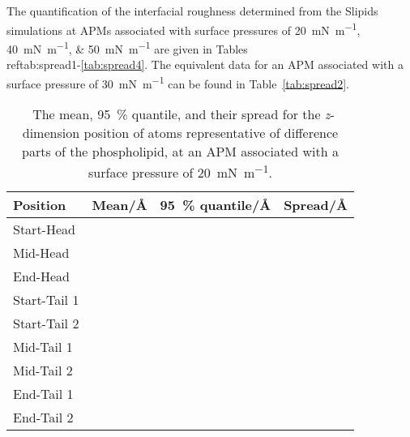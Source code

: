 The quantification of the interfacial roughness determined from the Slipids simulations at APMs associated with surface pressures of \SIlist{20;40;50}{\milli\newton\per\meter} are given in Tables~\\ref{tab:spread1}-\ref{tab:spread4}. 
The equivalent data for an APM associated with a surface pressure of \SI{30}{\milli\newton\per\meter} can be found in Table~\ref{tab:spread2}.
%
\begin{table}
\centering
\small
  \caption{\ The mean, \SI{95}{\percent} quantile, and their spread for the \emph{z}-dimension position of atoms representative of difference parts of the phospholipid, at an APM associated with a surface pressure of \SI{20}{\milli\newton\per\meter}.}
  \label{tab:spread1}
  \begin{tabular}{llll}
    \toprule
    Position & Mean/\si{\angstrom} & \SI{95}{\percent} quantile/\si{\angstrom} & Spread/\si{\angstrom} \\
    \midrule
    Start-Head &  &  &  \\
    Mid-Head &  &  &  \\
    End-Head &  &  &  \\
    \midrule
    Start-Tail 1 &  &  &  \\
    Start-Tail 2 &  &  &  \\
    Mid-Tail 1 &  &  &  \\
    Mid-Tail 2 &  &  &  \\
    End-Tail 1 &  &  &  \\
    End-Tail 2 &  &  &  \\
    \bottomrule
  \end{tabular}
\end{table}
